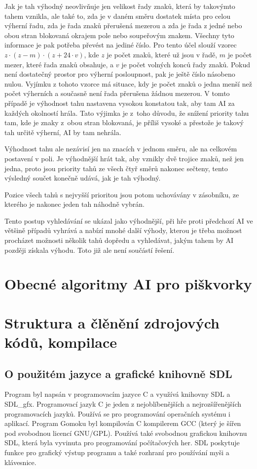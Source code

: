 \documentclass[a4paper,11pt,titlepage]{article}
\begin{document}
Jak je tah výhodný neovlivňuje jen velikost řady znaků, která by takovýmto tahem vznikla, ale také to, zda je v daném směru dostatek místa pro celou výherní řadu, zda je řada znaků přerušená mezerou a zda je řada z jedné nebo obou stran blokovaná okrajem pole nebo soupeřovým znakem. Všechny tyto informace je pak potřeba převést na jediné číslo. Pro tento účel slouží vzorec $z \cdot (z - m) \cdot (z + 24\cdot v)$, kde $z$ je počet znaků, které už jsou v řadě, $m$ je počet mezer, které řada znaků obsahuje, a $v$ je počet volných konců řady znaků. Pokud není dostatečný prostor pro výherní posloupnost, pak je ještě číslo násobeno nulou. Vyjímku z tohoto vzorce má situace, kdy je počet znaků o jedna menší než počet výherních a současně není řada přerušena žádnou mezerou. V tomto případě je výhodnost tahu nastavena vysokou konstatou tak, aby tam AI za každých okolností hrála. Tato výjimka je z~toho důvodu, že snížení priority tahu tam, kde je znaky z~obou stran blokovaná, je příliš vysoké a přestože je takový tah určitě výherní, AI by tam nehrála.

Výhodnost tahu ale nezávisí jen na znacích v jednom směru, ale na celkovém postavení v poli. Je výhodnější hrát tak, aby vznikly dvě trojice znaků, než jen jedna, proto jsou priority tahů ze všech čtyř směrů nakonec sečteny, tento výsledný součet konečně udává, jak je tah výhodný.

Pozice všech tahů s nejvyšší prioritou jsou potom uchovávány v zá\-sob\-níku, ze kterého je nakonec jeden tah náhodně vybrán.

Tento postup vyhledávání se ukázal jako výhodnější, při hře proti před\-cho\-zí AI ve většině případů vyhrává a nabízí mnohé další výhody, kterou je třeba možnost procházet možnosti několik tahů dopředu a vyhledávat, jakým tahem by AI později získala výhodu. Toto již ale není součástí řešení.
\section{Obecné algoritmy AI pro piškvorky}
\newpage
\section{Struktura a člěnění zdrojových kódů, kompilace}
\subsection{O použitém jazyce a grafické knihovně SDL}
Program byl napsán v programovacím jazyce C a využívá knihovny SDL a SDL\_gfx. Programovací jazyk C je jeden z nej\-ob\-lí\-be\-něj\-ších a nej\-roz\-ší\-ře\-něj\-ších programovacích jazyků. Používá se pro programování operačních systému i aplikací. Program Gomoku byl kompilován C kompilerem GCC (který je šířen pod svobodnou licencí GNU/GPL). Používá také svobodnou grafickou knihovnu SDL, která byla vyvinuta pro programování po\-čí\-ta\-čo\-vých her. SDL poskytuje funkce pro grafický výstup programu a také rozhraní pro používání myši a klávesnice.
\end{document}
